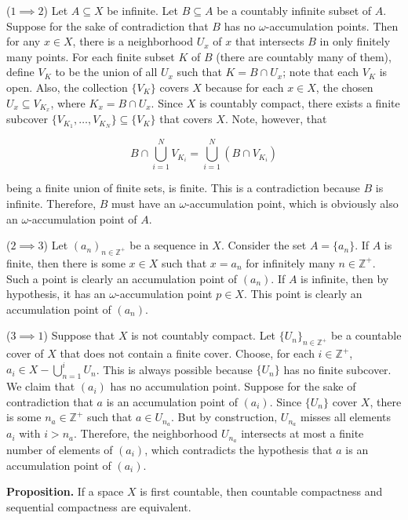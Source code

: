 \documentclass[12pt]{article}
\begin{document}
($1 \implies 2$) Let $A \subseteq X$ be infinite. Let $B \subseteq A$ be a countably infinite subset of $A$. Suppose for the sake of contradiction that $B$ has no $\omega$-accumulation points. Then for any $x \in X$, there is a neighborhood $U_x$ of $x$ that intersects $B$ in only finitely many points. For each finite subset $K$ of $B$ (there are countably many of them), define $V_K$ to be the union of all $U_x$ such that $K = B \cap U_x$; note that each $V_K$ is open. Also, the collection $\{ V_K \}$ covers $X$ because for each $x \in X$, the chosen $U_x \subseteq V_{K_x}$, where $K_x = B \cap U_x$. Since $X$ is countably compact, there exists a finite subcover $\{ V_{K_1}, \dots, V_{K_N} \} \subseteq \{ V_K \}$ that covers $X$. Note, however, that

$$B \cap \bigcup_{i = 1}^N V_{K_i} = \bigcup_{i = 1}^N (B \cap V_{K_i})$$

being a finite union of finite sets, is finite. This is a contradiction because $B$ is infinite. Therefore, $B$ must have an $\omega$-accumulation point, which is obviously also an $\omega$-accumulation point of $A$.

($2 \implies 3$) Let $(a_n)_{n \in \mathbb{Z}^+}$ be a sequence in $X$. Consider the set $A = \{ a_n \}$. If $A$ is finite, then there is some $x \in X$ such that $x = a_n$ for infinitely many $n \in \mathbb{Z}^+$. Such a point is clearly an accumulation point of $(a_n)$. If $A$ is infinite, then by hypothesis, it has an $\omega$-accumulation point $p \in X$. This point is clearly an accumulation point of $(a_n)$.

($3 \implies 1$) Suppose that $X$ is not countably compact. Let $\{ U_n \}_{n \in \mathbb{Z}^+}$ be a countable cover of $X$ that does not contain a finite cover. Choose, for each $i \in \mathbb{Z}^+$, $a_i \in X - \bigcup_{n = 1}^i U_n$. This is always possible because $\{ U_n \}$ has no finite subcover. We claim that $(a_i)$ has no accumulation point. Suppose for the sake of contradiction that $a$ is an accumulation point of $(a_i)$. Since $\{ U_n \}$ cover $X$, there is some $n_a \in \mathbb{Z}^+$ such that $a \in U_{n_a}$. But by construction, $U_{n_a}$ misses all elements $a_i$ with $i > n_a$. Therefore, the neighborhood $U_{n_a}$ intersects at most a finite number of elements of $(a_i)$, which contradicts the hypothesis that $a$ is an accumulation point of $(a_i)$.


\vspace{2 \baselineskip}

\textbf{Proposition. } If a space $X$ is first countable, then countable compactness and sequential compactness are equivalent.
\end{document}
